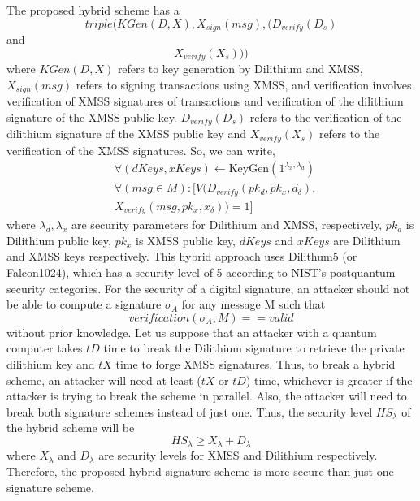 The proposed hybrid scheme has a
$$triple(KGen(D,X), X_{sign}(msg),  (D_{verify}(D_s) $$
and  $$X_{verify}(X_s)))$$
where $KGen(D, X)$ refers to key generation by Dilithium and XMSS, $X_{sign}(msg)$ refers to signing transactions using XMSS, and verification involves verification of XMSS signatures of transactions and
verification of the dilithium signature of the XMSS public key.
$ D_{verify}(D_s)$ refers to the verification of the dilithium signature of the XMSS public key and
$ X_{verify}(X_s)$ refers to the verification of the XMSS signatures.
So, we can write, 
\begin{align*}
& \forall (dKeys, xKeys) \leftarrow \text{KeyGen}(1^{\lambda_x, \lambda_d}) \\
& \forall (msg \in M): [V(D_{verify}(pk_d, pk_x, d_\delta), \\
& X_{verify}(msg, pk_x, x_\delta)) = 1]
\end{align*}
where $\lambda_d, \lambda_x$ are security parameters for Dilithium and XMSS, respectively,
$pk_d$ is Dilithium public key, $pk_x$ is XMSS public key, $dKeys$ and $xKeys$ are Dilithium and XMSS keys respectively. 
This hybrid approach uses Dilithum5 (or Falcon1024), which has a security level of 5 according to NIST's postquantum security categories.
For the security of a digital signature, an attacker should not be able to compute a signature $\sigma_A$ for any message M such that $$ verification(\sigma_A, M) == valid$$ without prior knowledge.
Let us suppose that an attacker with a quantum computer takes
$tD$ time to break the Dilithium signature to retrieve the private dilithium key and $tX$ time to forge XMSS signatures.
Thus, to break a hybrid scheme, an attacker will need at least ($tX$ or $tD$) time, whichever is greater
if the attacker is trying to break the scheme in parallel. 
Also, the attacker will need to break both signature schemes instead of just one.
Thus, the security level $HS_\lambda$ of the hybrid scheme will be $$ HS_\lambda \geq X_\lambda + D_\lambda$$
where $X_\lambda$ and $D_\lambda$ are security levels for XMSS and Dilithium
respectively.
Therefore, the proposed hybrid signature scheme is more secure than just one signature scheme.

